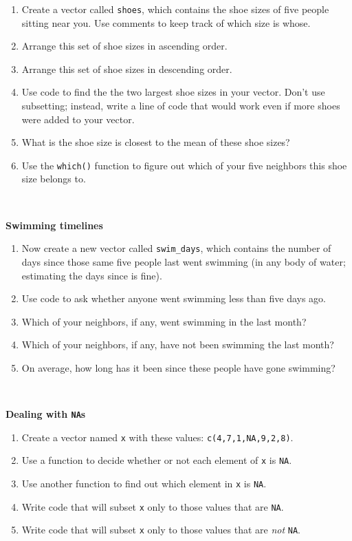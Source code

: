 \documentclass[
]{book}
\begin{document}
\begin{enumerate}
\def\labelenumi{\arabic{enumi}.}
\setcounter{enumi}{12}
\item
  Create a vector called \texttt{shoes}, which contains the shoe sizes of five people sitting near you. Use comments to keep track of which size is whose.
\item
  Arrange this set of shoe sizes in ascending order.
\item
  Arrange this set of shoe sizes in descending order.
\item
  Use code to find the the two largest shoe sizes in your vector. Don't use subsetting; instead, write a line of code that would work even if more shoes were added to your vector.
\item
  What is the shoe size is closest to the mean of these shoe sizes?
\item
  Use the \texttt{which()} function to figure out which of your five neighbors this shoe size belongs to.
\end{enumerate}

~

\textbf{Swimming timelines}

\begin{enumerate}
\def\labelenumi{\arabic{enumi}.}
\setcounter{enumi}{18}
\item
  Now create a new vector called \texttt{swim\_days}, which contains the number of days since those same five people last went swimming (in any body of water; estimating the days since is fine).
\item
  Use code to ask whether anyone went swimming less than five days ago.
\item
  Which of your neighbors, if any, went swimming in the last month?
\item
  Which of your neighbors, if any, have not been swimming the last month?
\item
  On average, how long has it been since these people have gone swimming?
\end{enumerate}

~

\textbf{Dealing with \texttt{NA}s}

\begin{enumerate}
\def\labelenumi{\arabic{enumi}.}
\setcounter{enumi}{23}
\item
  Create a vector named \texttt{x} with these values: \texttt{c(4,7,1,NA,9,2,8)}.
\item
  Use a function to decide whether or not each element of \texttt{x} is \texttt{NA}.
\item
  Use another function to find out which element in \texttt{x} is \texttt{NA}.
\item
  Write code that will subset \texttt{x} only to those values that are \texttt{NA}.
\item
  Write code that will subset \texttt{x} only to those values that are \emph{not} \texttt{NA}.
\end{enumerate}
\end{document}
